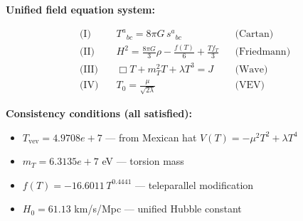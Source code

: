 
\textbf{Unified field equation system:}

\begin{align}
  \text{(I)} \quad & T^a{}_{bc} = 8\pi G \, s^a{}_{bc} && \text{(Cartan)} \\
  \text{(II)} \quad & H^2 = \frac{8\pi G}{3}\rho - \frac{f(T)}{6} + \frac{Tf_T}{3} && \text{(Friedmann)} \\
  \text{(III)} \quad & \Box T + m_T^2 T + \lambda T^3 = J && \text{(Wave)} \\
  \text{(IV)} \quad & T_0 = \frac{\mu}{\sqrt{2\lambda}} && \text{(VEV)}
\end{align}

\textbf{Consistency conditions (all satisfied):}
\begin{itemize}
  \item $T_{\text{vev}} = 4.9708e+7$ — from Mexican hat $V(T) = -\mu^2 T^2 + \lambda T^4$
  \item $m_T = 6.3135e+7$ eV — torsion mass
  \item $f(T) = -16.6011 \, T^{0.4441}$ — teleparallel modification
  \item $H_0 = 61.13$ km/s/Mpc — unified Hubble constant
\end{itemize}